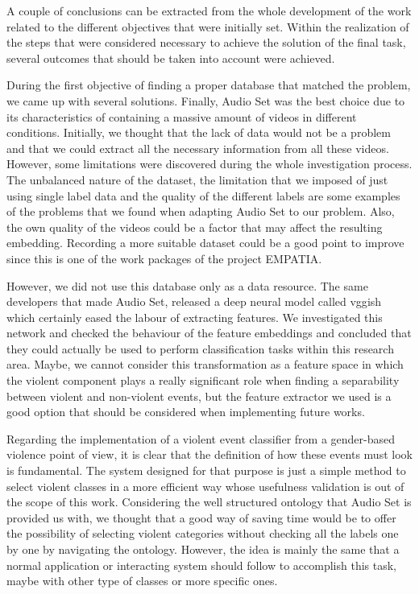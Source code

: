 
	A couple of conclusions can be extracted from the whole development of the work related to the different objectives that were initially set. Within the realization of the steps that were considered necessary to achieve the solution of the final task, several outcomes that should be taken into account were achieved.
	
	During the first objective of finding a proper database that matched the problem, we came up with several solutions. Finally, Audio Set was the best choice due to its characteristics of containing a massive amount of videos in different conditions. Initially, we thought that the lack of data would not be a problem and that we could extract all the necessary information from all these videos. However, some limitations were discovered during the whole investigation process. The unbalanced nature of the dataset, the limitation that we imposed of just using single label data and the quality of the different labels are some examples of the problems that we found when adapting Audio Set to our problem. Also, the own quality of the videos could be a factor that may affect the resulting embedding. Recording a more suitable dataset could be a good point to improve since this is one of the work packages of the project EMPATIA. 
	
	However, we did not use this database only as a %
	data resource. The same developers that made Audio Set, released a deep neural model called \acrshort{vgg}ish which certainly eased the labour of extracting features. We investigated this network and checked the behaviour of the feature embeddings and concluded that they could actually be used to perform classification tasks within this research area. Maybe, we cannot consider this transformation as a feature space in which the violent component plays a really significant role when finding a separability between violent and non-violent events, but the feature extractor we used is a good option that should be considered when implementing future works.
	
	Regarding the implementation of a violent event classifier from a gender-based violence point of view, it is clear that the definition of how these events must look is fundamental. The system designed for that purpose is just a simple method to select violent classes in a more efficient way whose usefulness validation is out of %
	the scope of this work. Considering the well structured ontology that Audio Set is provided us with, we thought that a good way of saving time would be to offer the possibility of selecting violent categories without checking all the labels one by one by navigating the ontology. However, the idea is mainly the same that a normal application or interacting system should follow to accomplish this task, maybe with other type of classes or more specific ones.
	
